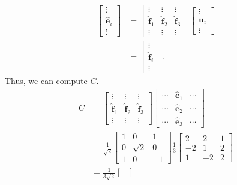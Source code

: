 \documentclass[12 pt, letterpaper]{hmcpset}
\begin{document}
\begin{solution}
\[\begin{split}
			\begin{bmatrix}
				\vdots \\
				\hat{\mathbf{e}}_{i} \\
				\vdots
			\end{bmatrix} & = 
			\begin{bmatrix}
				\vdots & \vdots & \vdots \\
				\hat{\mathbf{f}}_{1} & \hat{\mathbf{f}}_{2} & \hat{\mathbf{f}}_{3} \\
					\vdots & \vdots & \vdots
			\end{bmatrix}
			\begin{bmatrix}
				\vdots \\
				\mathbf{u}_{i} \\
				\vdots
			\end{bmatrix} \\ 
			& = 
			\begin{bmatrix}
				\vdots \\
				\hat{\mathbf{f}}_{i} \\
				\vdots
			\end{bmatrix}.
		\end{split}
	\]
	Thus, we can compute $C$.
	\[
		\begin{split}
			C & = \begin{bmatrix}
				\vdots & \vdots & \vdots \\
				\hat{\mathbf{f}}_{1} & \hat{\mathbf{f}}_{2} & \hat{\mathbf{f}}_{3} \\
					\vdots & \vdots & \vdots
			\end{bmatrix}
			\begin{bmatrix}
				\cdots & \hat{\mathbf{e}}_{1} & \cdots \\
				\cdots & \hat{\mathbf{e}}_{2} & \cdots \\
				\cdots & \hat{\mathbf{e}}_{3} & \cdots
			\end{bmatrix} \\
			  & = \frac{1}{\sqrt 2} \begin{bmatrix}
				  1 & 0 & 1 \\
				  0 & \sqrt 2 & 0 \\
				  1 & 0 & -1
			  \end{bmatrix} \frac{1}{3}
			  \begin{bmatrix}
				  2 & 2 & 1 \\
				  -2 & 1 & 2 \\
				  1 & -2 & 2
			  \end{bmatrix} \\
			  & = \frac{1}{3 \sqrt 2} \begin{bmatrix}

\end{bmatrix}
\end{split}\]
\end{solution}
\end{document}

